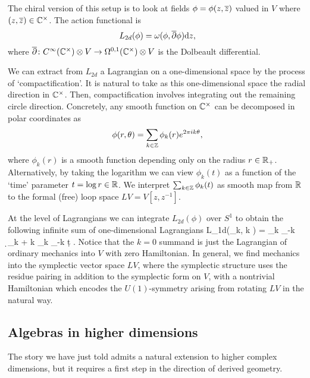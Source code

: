 \documentclass[11pt]{amsart}
\begin{document}
The chiral version of this setup is to look at fields $\phi = \phi(z,{\overline{z}})$ valued in $V$ where $(z,{\overline{z}}) \in \mathbb C^\times$.
The action functional is 
\[
L_{2d}(\phi) = \omega(\phi, {\overline{\partial}} \phi) {\rm d} z ,
\]
where ${\overline{\partial}} \colon C^\infty(\mathbb C^\times)\otimes V \to \Omega^{0,1}(\mathbb C^\times) \otimes V$ is the Dolbeault differential.

We can extract from $L_{2d}$ a Lagrangian on a one-dimensional space by the process of `compactification'. 
It is natural to take as this one-dimensional space the radial direction in $\mathbb C^\times$.
Then, compactification involves integrating out the remaining circle direction.
Concretely, any smooth function on $\mathbb C^\times$ can be decomposed in polar coordinates as
\[
\phi(r,\theta) = \sum_{k \in \mathbb Z} \phi_k(r) e^{2 \pi i k \theta} ,
\]
where $\phi_k(r)$ is a smooth function depending only on the radius $r \in \mathbb R_+$.
Alternatively, by taking the logarithm we can view $\phi_k(t)$ as a function of the `time' parameter $t = \log r \in \mathbb R$. 
We interpret $\sum_{k \in \mathbb Z} \phi_k(t)$ as smooth map from $\mathbb R$ to the formal (free) loop space $LV = V[z,z^{-1}]$. 

At the level of Lagrangians we can integrate $L_{2d}(\phi)$ over $S^1$ to obtain the following infinite sum of one-dimensional Lagrangians
\beqn
L_{1d}(\phi_k, k \in \ZZ) = \sum_{k\in \ZZ} \phi_{-k} \d \phi_{k} + k \phi_k \phi_{-k} \d t .
\eeqn 
Notice that the $k=0$ summand is just the Lagrangian of ordinary mechanics into $V$ with zero Hamiltonian. 
In general, we find mechanics into the symplectic vector space $LV$, where the symplectic structure uses the residue pairing in addition to the symplectic form on $V$, with a nontrivial Hamiltonian which encodes the $U(1)$-symmetry arising from rotating $LV$ in the natural way.

\subsection{Algebras in higher dimensions }

The story we have just told admits a natural extension to higher complex dimensions,
but it requires a first step in the direction of derived geometry.
\end{document}
